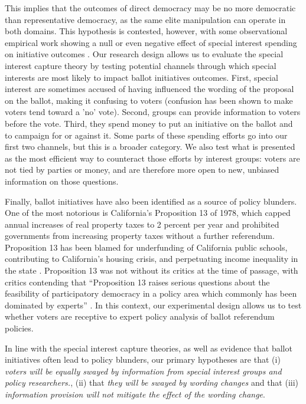 \documentclass[12pt,final,fleqn]{article}
\theoremstyle{plain}
\begin{document}
This implies that the outcomes of direct democracy may be no more democratic than representative democracy, as the same elite manipulation can operate in both domains. This hypothesis is contested, however, with some observational empirical work showing a null or even negative effect of special interest spending on initiative outcomes \citep{gerber1999populist}. Our research design allows us to evaluate the special interest capture theory by testing potential channels through which special interests are most likely to impact ballot initiatives outcomes. First, special interest are sometimes accused of having influenced the wording of the proposal on the ballot, making it confusing to voters (confusion has been shown to make voters tend toward a 'no' vote). Second, groups can provide information to voters before the vote. Third, they spend money to put an initiative on the ballot and to campaign for or against it. Some parts of these spending efforts go into our first two channels, but this is a broader category. We also test what is presented as the most efficient way to counteract those efforts by interest groups: voters are not tied by parties or money, and are therefore more open to new, unbiased information on those questions. 


Finally, ballot initiatives have also been identified as a source of policy blunders. One of the most notorious is California's Proposition 13 of 1978, which capped annual increases of real property taxes to 2 percent per year and prohibited governments from increasing property taxes without a further referendum. Proposition 13 has been blamed for underfunding of California public schools, contributing to California's housing crisis, and perpetuating income inequality in the state \citep{wasi2005property, catterall1985proposition}. Proposition 13 was not without its critics at the time of passage, with critics contending that ``Proposition 13 raises serious questions about the feasibility of participatory democracy in a policy area which commonly has been dominated by experts'' \citep{mccaffery1978participatory}. In this context, our experimental design allows us to test whether voters are receptive to expert policy analysis of ballot referendum policies. 


In line with the special interest capture theories, as well as evidence that ballot initiatives often lead to policy blunders, our primary hypotheses are that (i) \textit{voters will be equally swayed by information from special interest groups and policy researchers.}, (ii) that \textit{they will be swayed by wording changes} and that (iii) \textit{information provision will not mitigate the effect of the wording change}.   %
\end{document}
